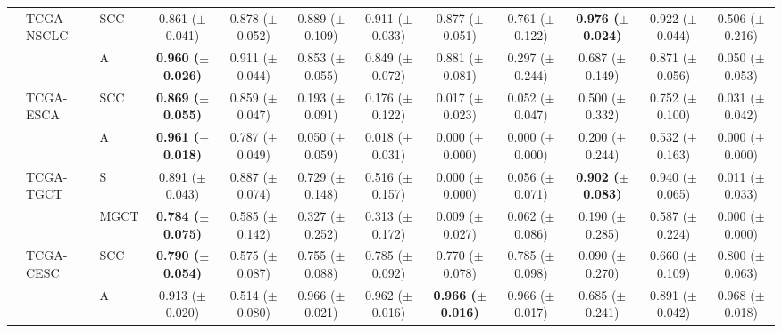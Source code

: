 \documentclass[10pt,twocolumn,letterpaper]{article}
\begin{document}
\begin{table}[h]
{{\begin{tabular}{lllcc|ccccc|cc}
          & TCGA-NSCLC & SCC          & 0.861 ($\pm$0.041)           & 0.878 ($\pm$0.052)           & 0.889 ($\pm$0.109)        & 0.911 ($\pm$0.033)          & 0.877 ($\pm$0.051)          & 0.761 ($\pm$0.122)          & \textbf{0.976 ($\pm$0.024)} & 0.922 ($\pm$0.044)        & 0.506 ($\pm$0.216)        \\
          &            & A                   & \textbf{0.960 ($\pm$0.026)}  & 0.911 ($\pm$0.044)           & 0.853 ($\pm$0.055)        & 0.849 ($\pm$0.072)          & 0.881 ($\pm$0.081)          & 0.297 ($\pm$0.244)          & 0.687 ($\pm$0.149)          & 0.871 ($\pm$0.056)        & 0.050 ($\pm$0.053)        \\
          & TCGA-ESCA  & SCC          & \textbf{0.869 ($\pm$0.055)}  & 0.859 ($\pm$0.047)           & 0.193 ($\pm$0.091)        & 0.176 ($\pm$0.122)          & 0.017 ($\pm$0.023)          & 0.052 ($\pm$0.047)          & 0.500 ($\pm$0.332)          & 0.752 ($\pm$0.100)        & 0.031 ($\pm$0.042)        \\
          &            & A                   & \textbf{0.961 ($\pm$0.018)}  & 0.787 ($\pm$0.049)           & 0.050 ($\pm$0.059)        & 0.018 ($\pm$0.031)          & 0.000 ($\pm$0.000)          & 0.000 ($\pm$0.000)          & 0.200 ($\pm$0.244)          & 0.532 ($\pm$0.163)        & 0.000 ($\pm$0.000)        \\
          & TCGA-TGCT  & S & 0.891 ($\pm$0.043)           & 0.887 ($\pm$0.074)           & 0.729 ($\pm$0.148)        & 0.516 ($\pm$0.157)          & 0.000 ($\pm$0.000)          & 0.056 ($\pm$0.071)          & \textbf{0.902 ($\pm$0.083)} & 0.940 ($\pm$0.065)        & 0.011 ($\pm$0.033)        \\
          &            & MGCT            & \textbf{0.784 ($\pm$0.075)}  & 0.585 ($\pm$0.142)           & 0.327 ($\pm$0.252)        & 0.313 ($\pm$0.172)          & 0.009 ($\pm$0.027)          & 0.062 ($\pm$0.086)          & 0.190 ($\pm$0.285)          & 0.587 ($\pm$0.224)        & 0.000 ($\pm$0.000)        \\
          & TCGA-CESC  & SCC          & \textbf{0.790 ($\pm$0.054)}  & 0.575 ($\pm$0.087)           & 0.755 ($\pm$0.088)        & 0.785 ($\pm$0.092)          & 0.770 ($\pm$0.078)          & 0.785 ($\pm$0.098)          & 0.090 ($\pm$0.270)          & 0.660 ($\pm$0.109)        & 0.800 ($\pm$0.063)        \\
          &            & A                   & 0.913 ($\pm$0.020)           & 0.514 ($\pm$0.080)           & 0.966 ($\pm$0.021)        & 0.962 ($\pm$0.016)          & \textbf{0.966 ($\pm$0.016)} & 0.966 ($\pm$0.017)          & 0.685 ($\pm$0.241)          & 0.891 ($\pm$0.042)        & 0.968 ($\pm$0.018) \\ \midrule\midrule

\end{tabular}}}
\end{table}
\end{document}
